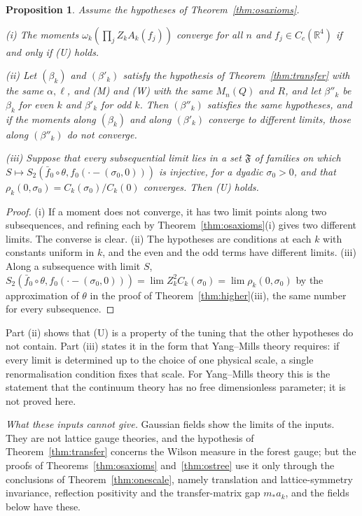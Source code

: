 \documentclass[aps,prd,twocolumn,superscriptaddress,nofootinbib,longbibliography,floatfix,amsmath,amssymb,10pt]{revtex4-2}
\newtheorem{proposition}[theorem]{Proposition}
\theoremstyle{definition}
\theoremstyle{remark}
\newcommand{\R}{\mathbb{R}}
\begin{document}
\begin{proposition}\label{prop:uniquelimit}
Assume the hypotheses of Theorem~\textup{\ref{thm:osaxioms}}.

\textup{(i)} The moments $\omega_k(\prod_jZ_kA_k(f_j))$ converge for all
$n$ and $f_j\in C_c(\R^4)$ if and only if \textup{(U)} holds.

\textup{(ii)} Let $(\beta_k)$ and $(\beta'_k)$ satisfy the hypothesis of
Theorem~\textup{\ref{thm:transfer}} with the same $\alpha,\ell$, and
\textup{(M)} and \textup{(W)} with the same $M_n(Q)$ and $R$, and let
$\beta''_k$ be $\beta_k$ for even $k$ and $\beta'_k$ for odd $k$. Then
$(\beta''_k)$ satisfies the same hypotheses, and if the moments along
$(\beta_k)$ and along $(\beta'_k)$ converge to different limits, those along
$(\beta''_k)$ do not converge.

\textup{(iii)} Suppose that every subsequential limit lies in a set
$\mathfrak F$ of families on which $S\mapsto S_2(\bar f_0\circ\theta,
f_0(\cdot-(\sigma_0,0)))$ is injective, for a dyadic $\sigma_0>0$, and that
$\rho_k(0,\sigma_0)=C_k(\sigma_0)/C_k(0)$ converges. Then \textup{(U)}
holds.
\end{proposition}

\begin{proof}
(i) If a moment does not converge, it has two limit points along two
subsequences, and refining each by Theorem~\ref{thm:osaxioms}(i) gives two
different limits. The converse is clear. (ii) The hypotheses are
conditions at each $k$ with constants uniform in $k$, and the even and the
odd terms have different limits. (iii) Along a subsequence with limit $S$,
$S_2(\bar f_0\circ\theta,f_0(\cdot-(\sigma_0,0)))=\lim Z_k^2C_k(\sigma_0)=
\lim\rho_k(0,\sigma_0)$ by the approximation of $\theta$ in the proof of
Theorem~\ref{thm:higher}(iii), the same number for every subsequence.
\end{proof}

Part (ii) shows that (U) is a property of the tuning that the other
hypotheses do not contain. Part (iii) states it in the form that Yang--Mills theory requires:
if every limit is determined up to the choice of one physical scale, a
single renormalisation condition fixes that scale. For Yang--Mills theory
this is the statement that the continuum theory has no free dimensionless
parameter; it is not proved here.

\emph{What these inputs cannot give.} Gaussian fields show the limits of
the inputs. They are not lattice gauge theories, and the hypothesis of
Theorem~\ref{thm:transfer} concerns the Wilson measure in the forest gauge;
but the proofs of Theorems~\ref{thm:osaxioms} and~\ref{thm:ostree} use it
only through the conclusions of Theorem~\ref{thm:onescale}, namely
translation and lattice-symmetry invariance, reflection positivity and the
transfer-matrix gap $m_*a_k$, and the fields below have these.
\end{document}
